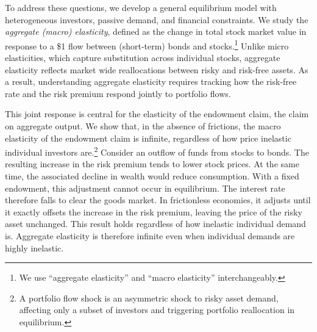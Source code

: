 \documentclass[12pt,english]{article}
\begin{document}
To address these questions, we develop a general equilibrium model with heterogeneous investors, passive demand, and financial constraints.
We study the \emph{aggregate (macro) elasticity}, defined as the change in total stock market value in response to a \$1 flow between (short-term) bonds and stocks.\footnote{We use ``aggregate elasticity'' and ``macro elasticity'' interchangeably.}
Unlike micro elasticities, which capture substitution across individual stocks, aggregate elasticity reflects market wide reallocations between risky and risk-free assets.
As a result, understanding aggregate elasticity requires tracking how the risk-free rate and the risk premium respond jointly to portfolio flows.

This joint response is central for the elasticity of the endowment claim, the claim on aggregate output.
We show that, in the absence of frictions, the macro elasticity of the endowment claim is infinite, regardless of how price inelastic individual investors are.\footnote{A portfolio flow shock is an asymmetric shock to risky asset demand, affecting only a subset of investors and triggering portfolio reallocation in equilibrium.}
Consider an outflow of funds from stocks to bonds.
The resulting increase in the risk premium tends to lower stock prices.
At the same time, the associated decline in wealth would reduce consumption.
With a fixed endowment, this adjustment cannot occur in equilibrium.
The interest rate therefore falls to clear the goods market.
In frictionless economies, it adjusts until it exactly offsets the increase in the risk premium, leaving the price of the risky asset unchanged.
This result holds regardless of how inelastic individual demand is.
Aggregate elasticity is therefore infinite even when individual demands are highly inelastic.
\end{document}

